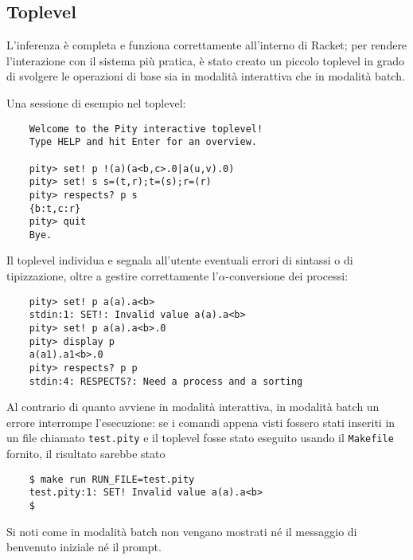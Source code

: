 \subsection{Toplevel}

L'inferenza \`e completa e funziona correttamente all'interno di Racket;
per rendere l'interazione con il sistema pi\`u pratica, \`e stato creato
un piccolo toplevel in grado di svolgere le operazioni di base sia in
modalit\`a interattiva che in modalit\`a batch.

Una sessione di esempio nel toplevel:

\begin{termlisting}
\begin{lstlisting}
    Welcome to the Pity interactive toplevel!
    Type HELP and hit Enter for an overview.

    pity> set! p !(a)(a<b,c>.0|a(u,v).0)
    pity> set! s s=(t,r);t=(s);r=(r)
    pity> respects? p s
    {b:t,c:r}
    pity> quit
    Bye.
\end{lstlisting}
\end{termlisting}

Il toplevel individua e segnala all'utente eventuali errori di sintassi
o di tipizzazione, oltre a gestire correttamente l'$\alpha$-conversione
dei processi:

\begin{termlisting}
\begin{lstlisting}
    pity> set! p a(a).a<b>
    stdin:1: SET!: Invalid value a(a).a<b>
    pity> set! p a(a).a<b>.0
    pity> display p
    a(a1).a1<b>.0
    pity> respects? p p
    stdin:4: RESPECTS?: Need a process and a sorting
\end{lstlisting}
\end{termlisting}

Al contrario di quanto avviene in modalit\`a interattiva, in modalit\`a
batch un errore interrompe l'esecuzione: se i comandi appena visti
fossero stati inseriti in un file chiamato \lstinline{test.pity} e il
toplevel fosse stato eseguito usando il \lstinline{Makefile} fornito,
il risultato sarebbe stato

\begin{termlisting}
\begin{lstlisting}
    $ make run RUN_FILE=test.pity
    test.pity:1: SET! Invalid value a(a).a<b>
    $
\end{lstlisting}
\end{termlisting}

Si noti come in modalit\`a batch non vengano mostrati n\'e il messaggio
di benvenuto iniziale n\'e il prompt.

